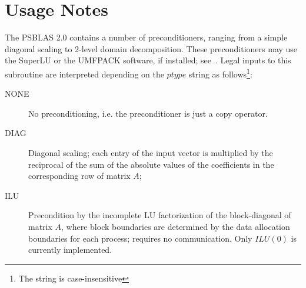 \section*{Usage Notes}
The PSBLAS 2.0 contains a number of preconditioners, ranging from a
simple diagonal scaling to 2-level domain decomposition. These
preconditioners may use the SuperLU or the UMFPACK software, if
installed; see~\cite{SUPERLU,UMFPACK}. 
Legal inputs to this subroutine are interpreted depending on the
$ptype$ string as follows\footnote{The string is case-insensitive}:
\begin{description}
\item[NONE] No preconditioning, i.e. the preconditioner is just a copy
  operator.
\item[DIAG] Diagonal scaling; each entry of the input vector is
  multiplied by the reciprocal of the sum of the absolute values of
  the coefficients in the corresponding row of matrix  $A$;
\item[ILU] Precondition by the incomplete LU factorization of the
  block-diagonal of matrix $A$, where block boundaries are determined
  by the data allocation boundaries for each process; requires no
  communication. Only $ILU(0)$ is currently implemented. 

\end{description}
